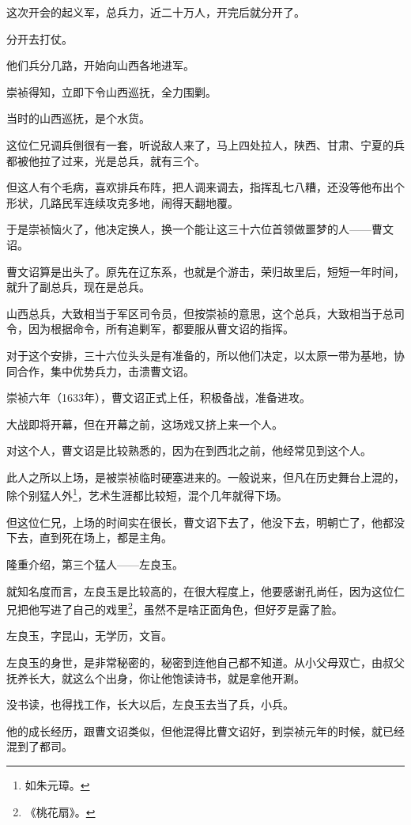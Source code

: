 \begin{multicols}{\theparacolNo}
这次开会的起义军，总兵力，近二十万人，开完后就分开了。

分开去打仗。

他们兵分几路，开始向山西各地进军。

崇祯得知，立即下令山西巡抚，全力围剿。

当时的山西巡抚，是个水货。

这位仁兄调兵倒很有一套，听说敌人来了，马上四处拉人，陕西、甘肃、宁夏的兵都被他拉了过来，光是总兵，就有三个。

但这人有个毛病，喜欢排兵布阵，把人调来调去，指挥乱七八糟，还没等他布出个形状，几路民军连续攻克多地，闹得天翻地覆。

于是崇祯恼火了，他决定换人，换一个能让这三十六位首领做噩梦的人——曹文诏。

曹文诏算是出头了。原先在辽东系，也就是个游击，荣归故里后，短短一年时间，就升了副总兵，现在是总兵。

山西总兵，大致相当于军区司令员，但按崇祯的意思，这个总兵，大致相当于总司令，因为根据命令，所有追剿军，都要服从曹文诏的指挥。

对于这个安排，三十六位头头是有准备的，所以他们决定，以太原一带为基地，协同合作，集中优势兵力，击溃曹文诏。

崇祯六年（1633年），曹文诏正式上任，积极备战，准备进攻。

大战即将开幕，但在开幕之前，这场戏又挤上来一个人。

对这个人，曹文诏是比较熟悉的，因为在到西北之前，他经常见到这个人。

此人之所以上场，是被崇祯临时硬塞进来的。一般说来，但凡在历史舞台上混的，除个别猛人外\footnote{如朱元璋。}，艺术生涯都比较短，混个几年就得下场。

但这位仁兄，上场的时间实在很长，曹文诏下去了，他没下去，明朝亡了，他都没下去，直到死在场上，都是主角。

隆重介绍，第三个猛人——左良玉。

就知名度而言，左良玉是比较高的，在很大程度上，他要感谢孔尚任，因为这位仁兄把他写进了自己的戏里\footnote{《桃花扇》。}，虽然不是啥正面角色，但好歹是露了脸。

左良玉，字昆山，无学历，文盲。

左良玉的身世，是非常秘密的，秘密到连他自己都不知道。从小父母双亡，由叔父抚养长大，就这么个出身，你让他饱读诗书，就是拿他开涮。

没书读，也得找工作，长大以后，左良玉去当了兵，小兵。

他的成长经历，跟曹文诏类似，但他混得比曹文诏好，到崇祯元年的时候，就已经混到了都司。


\end{multicols}
